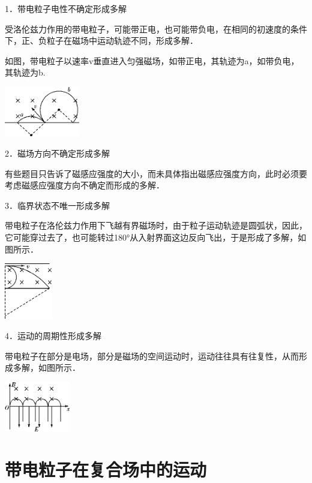\documentclass[cn,10.5pt,chinese,mac,chinesefont=founder]{elegantbook}
\begin{document}
1．带电粒子电性不确定形成多解

受洛伦兹力作用的带电粒子，可能带正电，也可能带负电，在相同的初速度的条件下，正、负粒子在磁场中运动轨迹不同，形成多解．

如图，带电粒子以速率v垂直进入匀强磁场，如带正电，其轨迹为a，如带负电，其轨迹为b.

\begin{center}\includegraphics[width=1.29236in,height=0.85833in]{media/image358.png}\end{center}


2．磁场方向不确定形成多解

有些题目只告诉了磁感应强度的大小，而未具体指出磁感应强度方向，此时必须要考虑磁感应强度方向不确定而形成的多解．


3．临界状态不唯一形成多解

带电粒子在洛伦兹力作用下飞越有界磁场时，由于粒子运动轨迹是圆弧状，因此，它可能穿过去了，也可能转过180°从入射界面这边反向飞出，于是形成了多解，如图所示．

\begin{center}\includegraphics[width=0.81111in,height=0.9625in]{media/image360.png}\end{center}


4．运动的周期性形成多解

带电粒子在部分是电场，部分是磁场的空间运动时，运动往往具有往复性，从而形成多解，如图所示．

\begin{center}\includegraphics[width=1.12292in,height=0.85833in]{media/image362.png}\end{center}
\newpage
\section{带电粒子在复合场中的运动}
\end{document}
